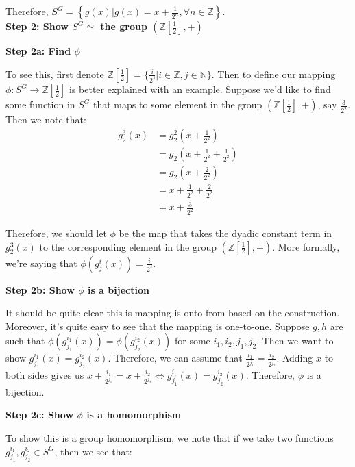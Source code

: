 \documentclass[12pt]{article}%
\newcommand{\N}{\mathbb{N}}
\newcommand{\Z}{\mathbb{Z}}
\begin{document}
Therefore, $S^G=\left\{g(x)|g(x)=x+\frac{1}{2^{n}}, \forall n\in \Z\right\}$.\\

\textbf{Step 2: Show $S^G\simeq$  the group $\left(\Z\left[\frac{1}{2}\right],+\right)$}

\textbf{Step 2a: Find $\phi$}

To see this, first denote $\Z\left[\frac{1}{2}\right]=\{ \frac{i}{2^j} | i \in \Z, j \in \N \}$. Then to define our mapping $\phi:S^G \rightarrow \Z\left[\frac{1}{2}\right]$ is better explained with an example. Suppose we'd like to find some function in $S^G$  that maps to some element in the group $\left(\Z\left[\frac{1}{2}\right],+\right)$, say $\frac{3}{2^2}$. Then we note that:
\begin{align*}
g_2^3(x)
&=g_2^2(x+\frac{1}{2^2})\\
&=g_2(x+\frac{1}{2^2}+\frac{1}{2^2})\\
&=g_2(x+\frac{2}{2^2})\\
&=x+\frac{1}{2^2}+\frac{2}{2^2}\\
&=x+\frac{3}{2^2}
\end{align*}

Therefore, we should let $\phi$ be the map that takes the dyadic constant term in  $g_2^3(x)$ to the corresponding element in the group $\left(\Z\left[\frac{1}{2}\right],+\right)$. More formally, we're saying that $\phi(g_j^i(x))=\frac{i}{2^j}$. 

\textbf{Step 2b: Show $\phi$ is a bijection}

It should be quite clear this is mapping is onto from based on the construction. Moreover, it's quite easy to see that the mapping is one-to-one. Suppose $g,h$ are such that $\phi(g_{j_1}^{i_1}(x))=\phi(g_{j_2}^{i_2}(x))$ for some $i_1,i_2,j_1,j_2$. Then we want to show $g_{j_1}^{i_1}(x)=g_{j_2}^{i_2}(x)$. Therefore, we can assume that $\frac{i_1}{2^{j_1}}=\frac{i_2}{2^{j_2}}$. Adding $x$ to both sides gives us  $x+\frac{i_1}{2^{j_1}}=x+\frac{i_2}{2^{j_2}}\Leftrightarrow g_{j_1}^{i_1}(x)=g_{j_2}^{i_2}(x)$. Therefore, $\phi$ is a bijection. 

\textbf{Step 2c: Show $\phi$ is a homomorphism}

To show this is a group homomorphism, we note that if we take two functions $g_{j_1}^{i_1}, g_{j_2}^{i_2} \in S^G$, then we see that:
\end{document}

